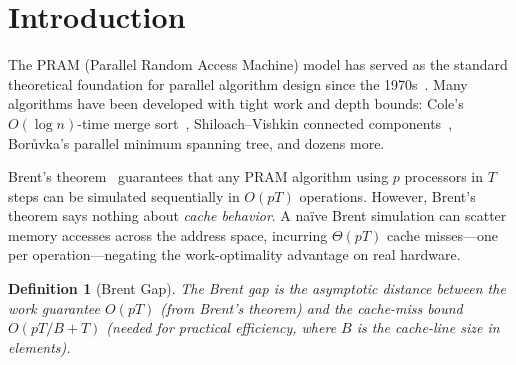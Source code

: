 \documentclass[11pt]{article}
\newtheorem{definition}[theorem]{Definition}
\begin{document}
\section{Introduction}
\label{sec:intro}

The PRAM (Parallel Random Access Machine) model has served as the standard
theoretical foundation for parallel algorithm design since the
1970s~\cite{jaja1992introduction}.  Many algorithms have been developed
with tight work and depth bounds: Cole's $O(\log n)$-time merge
sort~\cite{cole1988parallel}, Shiloach--Vishkin connected
components~\cite{shiloach1982logn}, Bor\r{u}vka's parallel minimum spanning
tree, and dozens more.

Brent's theorem~\cite{brent1974parallel} guarantees that any PRAM algorithm
using $p$ processors in $T$ steps can be simulated sequentially in $O(pT)$
operations.  However, Brent's theorem says nothing about \emph{cache behavior}.
A na\"ive Brent simulation can scatter memory accesses across the address space,
incurring $\Theta(pT)$ cache misses---one per operation---negating the
work-optimality advantage on real hardware.

\begin{definition}[Brent Gap]
The \emph{Brent gap} is the asymptotic distance between the work guarantee
$O(pT)$ (from Brent's theorem) and the cache-miss bound $O(pT/B + T)$ (needed
for practical efficiency, where $B$ is the cache-line size in elements).
\end{definition}
\end{document}
